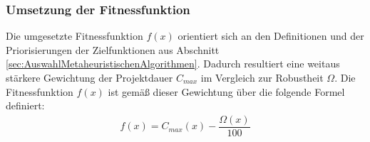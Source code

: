 \subsubsection*{Umsetzung der Fitnessfunktion}
Die umgesetzte Fitnessfunktion $f(x)$ orientiert sich an den Definitionen und der Priorisierungen der Zielfunktionen aus Abschnitt \ref{sec:AuswahlMetaheuristischenAlgorithmen}. Dadurch resultiert eine weitaus stärkere Gewichtung der Projektdauer $C_{max}$ im Vergleich zur Robustheit $\Omega$. Die Fitnessfunktion $f(x)$ ist gemäß dieser Gewichtung über die folgende Formel definiert:
\begin{align*}
f(x) = C_{max}(x) - \dfrac{\Omega(x)}{100}
\end{align*}
